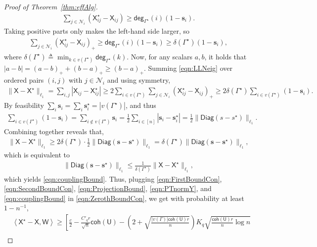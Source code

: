 \documentclass[12pt]{article}
\newcommand{\p}[1]{\left(#1\right)}
\newcommand{\innerP}[1]{\left\langle#1\right\rangle}
\newcommand{\s}[1]{\mathsf{#1}}
\begin{document}
\begin{proof}[Proof of Theorem~\ref{thm:effAlg}]
\begin{align}
\sum_{j\in\mathcal N_i}\p{\s{X}^\star_{ij}-\s{X}_{ij}}
\geq\s{deg}_{\Gamma^\star}(i)(1-\mathbf{s}_i).
\end{align}
Taking positive parts only makes the left-hand side larger, so
\begin{align}
\sum_{j\in\mathcal N_i}\p{\s{X}^\star_{ij}-\s{X}_{ij}}_+
\geq\s{deg}_{\Gamma^\star}(i)(1-\mathbf{s}_i)
\geq\delta(\Gamma^\star)(1-\mathbf{s}_i),\label{eqn:LLNeig}
\end{align}
where $ \delta(\Gamma^\star)\triangleq\min_{k\in v(\Gamma^\star)}\s{deg}_{\Gamma^\star}(k) $. Now, for any scalars $ a,b $, it holds that $ |a-b|=(a-b)_++(b-a)_+\ge(b-a)_+ $. Summing \eqref{eqn:LLNeig} over ordered pairs $ (i,j) $ with $ j\in\mathcal{N}_i $ and using symmetry,
\begin{align}
\|\s{X}-\s{X}^\star\|_{\ell_1}
=\sum_{i,j}|\s{X}_{ij}-\s{X}^\star_{ij}|
\geq2\sum_{i\in v(\Gamma^\star)}\sum_{j\in\mathcal N_i}\p{\s{X}^\star_{ij}-\s{X}_{ij}}_+
\geq2\delta(\Gamma^\star)\sum_{i\in v(\Gamma^\star)}(1-\mathbf{s}_i).
\end{align}
By feasibility $ \sum_i \mathbf{s}_i=\sum_i \mathbf{s}_i^\star=|v(\Gamma^\star)| $, and thus
\begin{align}
\sum_{i\in v(\Gamma^\star)}(1-\mathbf{s}_i)
=\sum_{i\notin v(\Gamma^\star)} \mathbf{s}_i
=\frac{1}{2}\sum_{i\in[n]} |\mathbf{s}_i-\mathbf{s}_i^\star|
=\frac{1}{2}\|\s{Diag}(s-s^\star)\|_{\ell_1}.
\end{align}
Combining together reveals that,
\begin{align}
\|\s{X}-\s{X}^\star\|_{\ell_1}
\geq2\delta(\Gamma^\star)\cdot \frac{1}{2}\|\s{Diag}(\mathbf{s}-\mathbf{s}^\star)\|_{\ell_1}
=\delta(\Gamma^\star)\|\s{Diag}(\mathbf{s}-\mathbf{s}^\star)\|_{\ell_1},
\end{align}
which is equivalent to
\begin{align}
\|\s{Diag}(\mathbf{s}-\mathbf{s}^\star)\|_{\ell_1}\leq\frac{1}{\delta(\Gamma^\star)}\|\s{X}-\s{X}^\star\|_{\ell_1},
\end{align}
which yields \eqref{eqn:couplingBound}. Thus, plugging \eqref{eqn:FirstBoundCon}, \eqref{eqn:SecondBoundCon}, \eqref{eqn:ProjectionBound}, \eqref{eqn:PTnormY}, and \eqref{eqn:couplingBound} in \eqref{eqn:ZerothBoundCon}, we get with probability at least $1-n^{-1}$,
\begin{align}
    &\innerP{\s{X}^\star-\s{X},\s{W}}\geq\left[\frac{c}{2}
    -\frac{C'_qr}{\sqrt{n}}\s{coh}(\s{U})
    -\p{2 + \sqrt{ \frac{|v(\Gamma)| \s{coh}(\s{U})r}{n}}}K_q\sqrt{\frac{\s{coh}(\s{U}) r}{n} \log n}\right.\nonumber\\

\end{align}
\end{proof}
\end{document}
